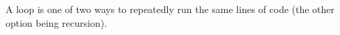 A loop is one of two ways to repeatedly run the same lines of code (the other option being recursion).